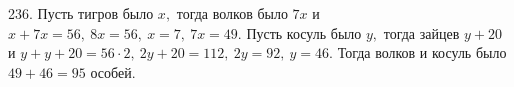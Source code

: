 236. Пусть тигров было $x,$ тогда волков было $7x$ и $x+7x=56,\ 8x=56,\ x=7,\ 7x=49.$ Пусть косуль было $y,$ тогда зайцев $y+20$ и $y+y+20=56\cdot2,\ 2y+20=112,\ 2y=92,\ y=46.$ Тогда волков и косуль было $49+46=95$ особей.\\
